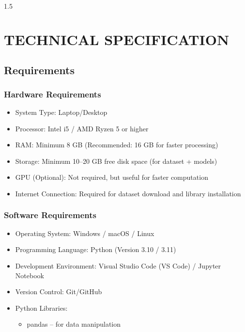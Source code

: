 \begin{spacing}{1.5}
\chapter{\MakeUppercase{Technical Specification}}



\section{Requirements}
\subsection{Hardware Requirements}
\begin{itemize}
    \item System Type: Laptop/Desktop

\item Processor: Intel i5 / AMD Ryzen 5 or higher

\item RAM: Minimum 8 GB (Recommended: 16 GB for faster processing)

\item Storage: Minimum 10–20 GB free disk space (for dataset + models)

\item GPU (Optional): Not required, but useful for faster computation

\item Internet Connection: Required for dataset download and library installation
\end{itemize}
\subsection{Software Requirements}
\begin{itemize}
    \item Operating System: Windows / macOS / Linux

\item Programming Language: Python (Version 3.10 / 3.11)

\item Development Environment: Visual Studio Code (VS Code) / Jupyter Notebook


\item Version Control: Git/GitHub

\item Python Libraries:
\begin{itemize}
    \item pandas – for data manipulation


\end{itemize}
\end{itemize}
\end{spacing}
